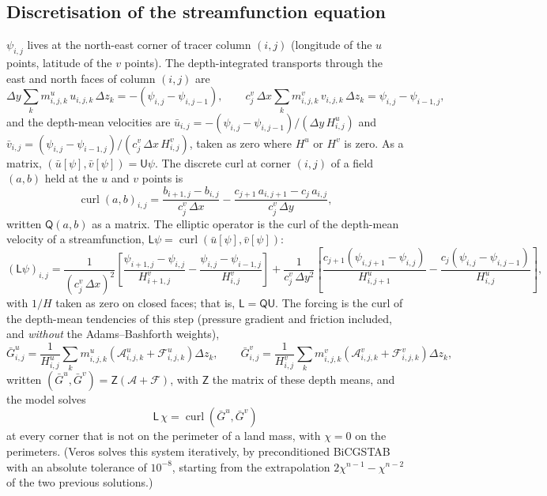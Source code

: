 \documentclass{article}
\begin{document}
\subsection{Discretisation of the streamfunction equation}\label{sec:psi_discrete}

$\psi_{i,j}$ lives at the north-east corner of tracer column $(i,j)$ (longitude of the $u$ points, latitude of the $v$ points).
The depth-integrated transports through the east and north faces of column $(i,j)$ are
\begin{equation}
\Delta y \sum_k m^u_{i,j,k}\, u_{i,j,k}\,\Delta z_k = -\left( \psi_{i,j} - \psi_{i,j-1} \right),
\qquad
c^v_j\,\Delta x \sum_k m^v_{i,j,k}\, v_{i,j,k}\,\Delta z_k = \psi_{i,j} - \psi_{i-1,j},
\label{eq:psi_transport}
\end{equation}
and the depth-mean velocities are $\bar u_{i,j} = -(\psi_{i,j} - \psi_{i,j-1})/(\Delta y\,H^u_{i,j})$ and $\bar v_{i,j} = (\psi_{i,j} - \psi_{i-1,j})/(c^v_j\,\Delta x\,H^v_{i,j})$, taken as zero where $H^u$ or $H^v$ is zero. As a matrix, $(\bar u[\psi], \bar v[\psi]) = \mathsf{U}\psi$.
The discrete curl at corner $(i,j)$ of a field $(a,b)$ held at the $u$ and $v$ points is
\[
\operatorname{curl}(a,b)_{i,j} = \frac{b_{i+1,j} - b_{i,j}}{c^v_j\,\Delta x} - \frac{c_{j+1}\,a_{i,j+1} - c_j\,a_{i,j}}{c^v_j\,\Delta y},
\]
written $\mathsf{Q}(a,b)$ as a matrix.
The elliptic operator is the curl of the depth-mean velocity of a streamfunction, $\mathsf{L}\psi = \operatorname{curl}(\bar u[\psi], \bar v[\psi])$:
\[
(\mathsf{L}\psi)_{i,j} = \frac{1}{(c^v_j\,\Delta x)^2}\left[ \frac{\psi_{i+1,j} - \psi_{i,j}}{H^v_{i+1,j}} - \frac{\psi_{i,j} - \psi_{i-1,j}}{H^v_{i,j}} \right]
+ \frac{1}{c^v_j\,\Delta y^2}\left[ \frac{c_{j+1}\left( \psi_{i,j+1} - \psi_{i,j} \right)}{H^u_{i,j+1}} - \frac{c_j\left( \psi_{i,j} - \psi_{i,j-1} \right)}{H^u_{i,j}} \right],
\]
with $1/H$ taken as zero on closed faces; that is, $\mathsf{L} = \mathsf{Q}\mathsf{U}$.
The forcing is the curl of the depth-mean tendencies of this step (pressure gradient and friction included, and \emph{without} the Adams--Bashforth weights),
\[
\bar G^u_{i,j} = \frac{1}{H^u_{i,j}} \sum_k m^u_{i,j,k} \left( \mathcal{A}^u_{i,j,k} + \mathcal{F}^u_{i,j,k} \right) \Delta z_k,
\qquad
\bar G^v_{i,j} = \frac{1}{H^v_{i,j}} \sum_k m^v_{i,j,k} \left( \mathcal{A}^v_{i,j,k} + \mathcal{F}^v_{i,j,k} \right) \Delta z_k ,
\]
written $(\bar G^u, \bar G^v) = \mathsf{Z}(\mathcal{A} + \mathcal{F})$, with $\mathsf{Z}$ the matrix of these depth means,
and the model solves
\[
\mathsf{L}\,\chi = \operatorname{curl}\left( \bar G^u, \bar G^v \right)
\]
at every corner that is not on the perimeter of a land mass, with $\chi = 0$ on the perimeters. (Veros solves this system iteratively, by preconditioned BiCGSTAB with an absolute tolerance of $10^{-8}$, starting from the extrapolation $2\chi^{n-1} - \chi^{n-2}$ of the two previous solutions.)
\end{document}
